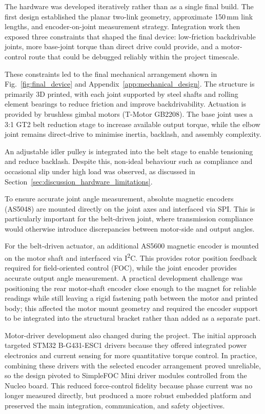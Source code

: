 The hardware was developed iteratively rather than as a single final build. The first design established the planar two-link geometry, approximate 150\,mm link lengths, and encoder-on-joint measurement strategy. Integration work then exposed three constraints that shaped the final device: low-friction backdrivable joints, more base-joint torque than direct drive could provide, and a motor-control route that could be debugged reliably within the project timescale.

These constraints led to the final mechanical arrangement shown in Fig.~\ref{fig:final_device} and Appendix~\ref{app:mechanical_design}. The structure is primarily 3D printed, with each joint supported by steel shafts and rolling element bearings to reduce friction and improve backdrivability. Actuation is provided by brushless gimbal motors (T-Motor GB2208)\cite{tmotor_gb2208}. The base joint uses a 3:1 GT2 belt reduction stage to increase available output torque, while the elbow joint remains direct-drive to minimise inertia, backlash, and assembly complexity.

An adjustable idler pulley is integrated into the belt stage to enable tensioning and reduce backlash. Despite this, non-ideal behaviour such as compliance and occasional slip under high load was observed, as discussed in Section~\ref{sec:discussion_hardware_limitations}.

To ensure accurate joint angle measurement, absolute magnetic encoders (AS5048)\cite{ams_as5048_2018} are mounted directly on the joint axes and interfaced via SPI. This is particularly important for the belt-driven joint, where transmission compliance would otherwise introduce discrepancies between motor-side and output angles.

For the belt-driven actuator, an additional AS5600 magnetic encoder\cite{ams_as5600_2018} is mounted on the motor shaft and interfaced via I\textsuperscript{2}C. This provides rotor position feedback required for field-oriented control (FOC), while the joint encoder provides accurate output angle measurement. A practical development challenge was positioning the rear motor-shaft encoder close enough to the magnet for reliable readings while still leaving a rigid fastening path between the motor and printed body; this affected the motor mount geometry and required the encoder support to be integrated into the structural bracket rather than added as a separate part.

Motor-driver development also changed during the project. The initial approach targeted STM32 B-G431-ESC1 drivers because they offered integrated power electronics and current sensing for more quantitative torque control. In practice, combining these drivers with the selected encoder arrangement proved unreliable, so the design pivoted to SimpleFOC Mini driver modules controlled from the Nucleo board. This reduced force-control fidelity because phase current was no longer measured directly, but produced a more robust embedded platform and preserved the main integration, communication, and safety objectives.


